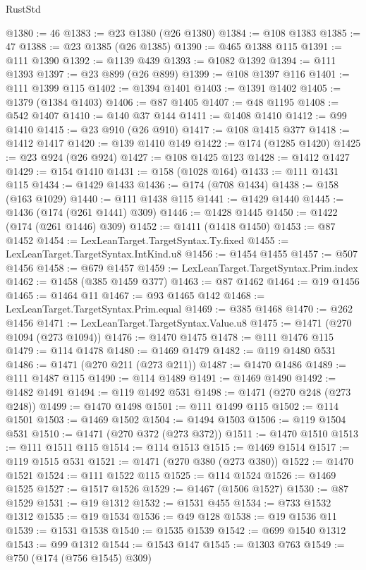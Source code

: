 \begin{lexlean}{RustStd}
\begin{coremodule}
{\begin{coremodule}
{{{{{{{{{{{{{{{{{{{{{{{{{{{{{{{{{{{{{{{{{{{{{{{{{{{{{{{{{{{{{{{{{{{{{{{{{{{{{{@1380 := 46
@1383 := @23 @1380 (@26 @1380)
@1384 := @108 @1383
@1385 := 47
@1388 := @23 @1385 (@26 @1385)
@1390 := @465 @1388 @115
@1391 := @111 @1390
@1392 := @1139 @439
@1393 := @1082 @1392
@1394 := @111 @1393
@1397 := @23 @899 (@26 @899)
@1399 := @108 @1397 @116
@1401 := @111 @1399 @115
@1402 := @1394 @1401
@1403 := @1391 @1402
@1405 := @1379 (@1384 @1403)
@1406 := @87 @1405
@1407 := @48 @1195
@1408 := @542 @1407
@1410 := @140 @37 @144
@1411 := @1408 @1410
@1412 := @99 @1410
@1415 := @23 @910 (@26 @910)
@1417 := @108 @1415 @377
@1418 := @1412 @1417
@1420 := @139 @1410 @149
@1422 := @174 (@1285 @1420)
@1425 := @23 @924 (@26 @924)
@1427 := @108 @1425 @123
@1428 := @1412 @1427
@1429 := @154 @1410
@1431 := @158 (@1028 @164)
@1433 := @111 @1431 @115
@1434 := @1429 @1433
@1436 := @174 (@708 @1434)
@1438 := @158 (@163 @1029)
@1440 := @111 @1438 @115
@1441 := @1429 @1440
@1445 := @1436 (@174 (@261 @1441) @309)
@1446 := @1428 @1445
@1450 := @1422 (@174 (@261 @1446) @309)
@1452 := @1411 (@1418 @1450)
@1453 := @87 @1452
@1454 := LexLeanTarget.TargetSyntax.Ty.fixed
@1455 := LexLeanTarget.TargetSyntax.IntKind.u8
@1456 := @1454 @1455
@1457 := @507 @1456
@1458 := @679 @1457
@1459 := LexLeanTarget.TargetSyntax.Prim.index
@1462 := @1458 (@385 @1459 @377)
@1463 := @87 @1462
@1464 := @19 @1456
@1465 := @1464 @11
@1467 := @93 @1465 @142
@1468 := LexLeanTarget.TargetSyntax.Prim.equal
@1469 := @385 @1468
@1470 := @262 @1456
@1471 := LexLeanTarget.TargetSyntax.Value.u8
@1475 := @1471 (@270 @1094 (@273 @1094))
@1476 := @1470 @1475
@1478 := @111 @1476 @115
@1479 := @114 @1478
@1480 := @1469 @1479
@1482 := @119 @1480 @531
@1486 := @1471 (@270 @211 (@273 @211))
@1487 := @1470 @1486
@1489 := @111 @1487 @115
@1490 := @114 @1489
@1491 := @1469 @1490
@1492 := @1482 @1491
@1494 := @119 @1492 @531
@1498 := @1471 (@270 @248 (@273 @248))
@1499 := @1470 @1498
@1501 := @111 @1499 @115
@1502 := @114 @1501
@1503 := @1469 @1502
@1504 := @1494 @1503
@1506 := @119 @1504 @531
@1510 := @1471 (@270 @372 (@273 @372))
@1511 := @1470 @1510
@1513 := @111 @1511 @115
@1514 := @114 @1513
@1515 := @1469 @1514
@1517 := @119 @1515 @531
@1521 := @1471 (@270 @380 (@273 @380))
@1522 := @1470 @1521
@1524 := @111 @1522 @115
@1525 := @114 @1524
@1526 := @1469 @1525
@1527 := @1517 @1526
@1529 := @1467 (@1506 @1527)
@1530 := @87 @1529
@1531 := @19 @1312
@1532 := @1531 @455
@1534 := @733 @1532 @1312
@1535 := @19 @1534
@1536 := @49 @128
@1538 := @19 @1536 @11
@1539 := @1531 @1538
@1540 := @1535 @1539
@1542 := @699 @1540 @1312
@1543 := @99 @1312
@1544 := @1543 @147
@1545 := @1303 @763
@1549 := @750 (@174 (@756 @1545) @309)
}}}}}}}}}}}}}}}}}}}}}}}}}}}}}}}}}}}}}}}}}}}}}}}}}}}}}}}}}}}}}}}}}}}}}}}}}}}}}}
\end{coremodule}}
\end{coremodule}
\end{lexlean}
